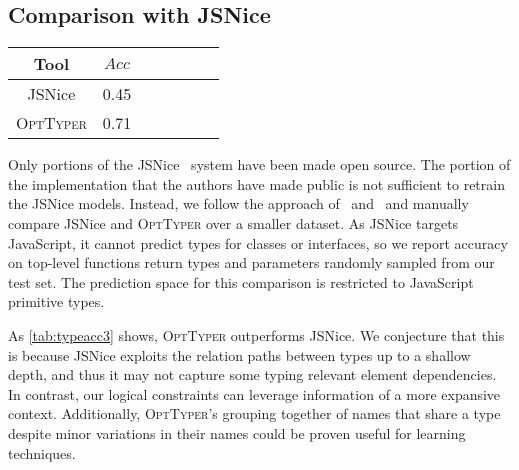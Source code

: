 \documentclass[acmsmall, review, anonymous]{acmart}\settopmatter{printfolios=true,printccs=false,printacmref=false}
\newcommand{\projectname}{\textsc{OptTyper}\xspace}
\begin{document}

\subsection{Comparison with JSNice}
\begin{table*}[t]
	\centering
	\caption{Accuracy for JSNice and OptTyper; on 107 annotations slots.}
		\label{tab:typeacc3}
	\begin{tabular}{ccccccc}
		\toprule
		Tool   & $Acc$ \\
		\midrule
		JSNice     & 0.45\\
		\projectname & 0.71\\
		\bottomrule
	\end{tabular}
\end{table*}

Only portions of the JSNice~\cite{raychev15} system have been made open source. 
The portion of the implementation that the authors have made public is not sufficient to retrain the JSNice models. 
Instead, we follow the approach of~\citet{hellendoorn18} and~\citet{wei20} and manually compare JSNice and \projectname over a smaller dataset. 
As JSNice targets JavaScript, it cannot predict types for classes or interfaces, so we report accuracy on top-level functions return types and parameters randomly sampled from our test set. The prediction
space for this comparison is restricted to JavaScript primitive types.

As \cref{tab:typeacc3} shows, \projectname outperforms JSNice. We conjecture that this is because JSNice exploits the relation paths between types up to a shallow depth, and thus it may not
capture some typing relevant element dependencies. 
In contrast, our logical constraints can leverage information of a more expansive context.
Additionally, \projectname's grouping together of names that share a type despite minor variations in their names could be proven useful for learning techniques.

\end{document}

